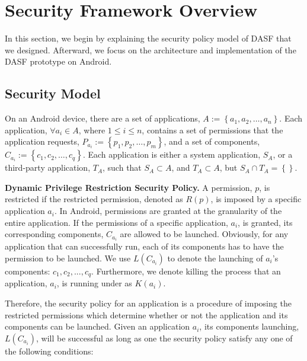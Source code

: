 \section{Security Framework Overview}

In this section, we begin by explaining the security policy model of
DASF that we designed. Afterward, we focus on
the architecture and implementation of the DASF prototype on Android.

\subsection{Security Model}

On an Android device, there are
a set of applications, $A := \left\{a_{1},a_{2},\ldots,a_{n}\right\}$.
Each application, $\forall a_{i} \in A$, where $1 \le i \le n$,
contains a set of permissions that the application requests,
$P_{a_{i}} := \left\{p_{1}, p_{2},\ldots,p_{m}\right\}$,
and a set of components,
$C_{a_{i}} := \left\{c_{1},c_{2},\ldots,c_{q}\right\}$.
Each application is either a system application, $S_{A}$,
or a third-party application, $T_{A}$, such that $S_{A}\subset A$, and $T_{A} \subset A$,
but $S_{A} \cap T_{A} = \left\{\right\}$.

\textbf{Dynamic Privilege Restriction Security Policy.}  A
permission, $p$, is restricted if the restricted permission, denoted
as $R\left(p\right)$, is imposed
by a specific application $a_{i}$.
In Android, permissions are granted at the granularity
of the entire application.  If the permissions of a specific
application, $a_i$, is granted, its corresponding components,
$C_{a_i}$ are allowed to be launched. Obviously, for any application
that can successfully run, each of its components has to have the
permission to be launched. We use $L(C_{a_i})$ to
denote the launching of $a_i$'s components: $c_1, c_2,...,c_q$.
%
Furthermore, we denote killing the process
that an application, $a_{i}$, is running under as $K(a_{i})$.

Therefore, the security policy for an application is a procedure of
imposing the restricted permissions which determine whether or not the
application and its components can be launched. Given an application
$a_i$, its components launching, $L(C_{a_i})$, will be
successful as long as one the security policy satisfy any one of the
following conditions:

